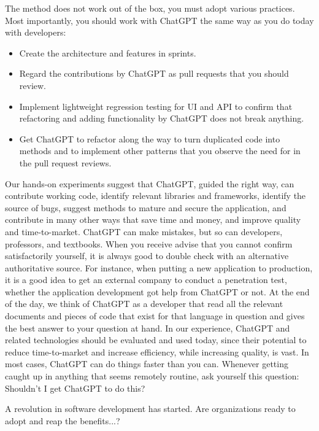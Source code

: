 \documentclass[runningheads]{llncs}
\begin{document}
The method does not work out of the box, you must adopt various practices. Most importantly, you should work with ChatGPT the same way as you do today with developers:
\begin{itemize}
    \item Create the architecture and features in sprints.
    \item Regard the contributions by ChatGPT as pull requests that you should review.
    \item Implement lightweight regression testing for UI and API to confirm that refactoring and adding functionality by ChatGPT does not break anything.
    \item Get ChatGPT to refactor along the way to turn duplicated code into methods and to implement other patterns that you observe the need for in the pull request reviews.
\end{itemize}
Our hands-on experiments suggest that ChatGPT, guided the right way, can contribute working code, identify relevant libraries and frameworks, identify the source of bugs, suggest methods to mature and secure the application, and contribute in many other ways that save time and money, and improve quality and time-to-market.
ChatGPT can make mistakes, but so can developers, professors, and textbooks. When you receive advise that you cannot confirm satisfactorily yourself, it is always good to double check with an alternative authoritative source. For instance, when putting a new application to production, it is a good idea to get an external company to conduct a penetration test, whether the application development got help from ChatGPT or not.
At the end of the day, we think of ChatGPT as a developer that read all the relevant documents and pieces of code that exist for that language in question and gives the best answer to your question at hand. In our experience, ChatGPT and related technologies should be evaluated and used today, since their potential to reduce time-to-market and increase efficiency, while increasing quality, is vast.
In most cases, ChatGPT can do things faster than you can. Whenever getting caught up in anything that seems remotely routine, ask yourself this question: Shouldn't I get ChatGPT to do this?

A revolution in software development has started. Are organizations ready to adopt and reap the benefits...?

\appendix
\end{document}
